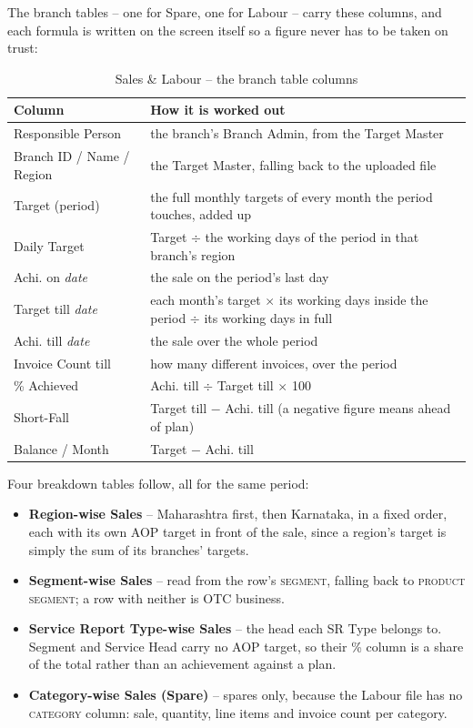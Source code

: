 \documentclass[11pt,a4paper]{article}
\newcommand{\col}[1]{\textsc{\small #1}}
\begin{document}
The branch tables -- one for Spare, one for Labour -- carry these columns, and each
formula is written on the screen itself so a figure never has to be taken on trust:

\begin{table}[H]\centering\small
\begin{tabularx}{\linewidth}{@{}p{4.4cm}X@{}}
\toprule
\textbf{Column} & \textbf{How it is worked out} \\
\midrule
Responsible Person & the branch's Branch Admin, from the Target Master \\
Branch ID / Name / Region & the Target Master, falling back to the uploaded file \\
Target (period) & the full monthly targets of every month the period touches, added up \\
Daily Target & Target $\div$ the working days of the period in that branch's region \\
Achi. on \textit{date} & the sale on the period's last day \\
Target till \textit{date} & each month's target $\times$ its working days inside the
period $\div$ its working days in full \\
Achi. till \textit{date} & the sale over the whole period \\
Invoice Count till & how many different invoices, over the period \\
\% Achieved & Achi. till $\div$ Target till $\times$ 100 \\
Short-Fall & Target till $-$ Achi. till (a negative figure means ahead of plan) \\
Balance / Month & Target $-$ Achi. till \\
\bottomrule
\end{tabularx}
\caption{Sales \& Labour -- the branch table columns}
\end{table}

Four breakdown tables follow, all for the same period:

\begin{itemize}
  \item \textbf{Region-wise Sales} -- Maharashtra first, then Karnataka, in a fixed order,
  each with its own AOP target in front of the sale, since a region's target is simply
  the sum of its branches' targets.
  \item \textbf{Segment-wise Sales} -- read from the row's \col{segment}, falling back to
  \col{product segment}; a row with neither is OTC business.
  \item \textbf{Service Report Type-wise Sales} -- the head each SR Type belongs to.
  Segment and Service Head carry no AOP target, so their \% column is a share of the
  total rather than an achievement against a plan.
  \item \textbf{Category-wise Sales (Spare)} -- spares only, because the Labour file has
  no \col{category} column: sale, quantity, line items and invoice count per category.
\end{itemize}
\end{document}

